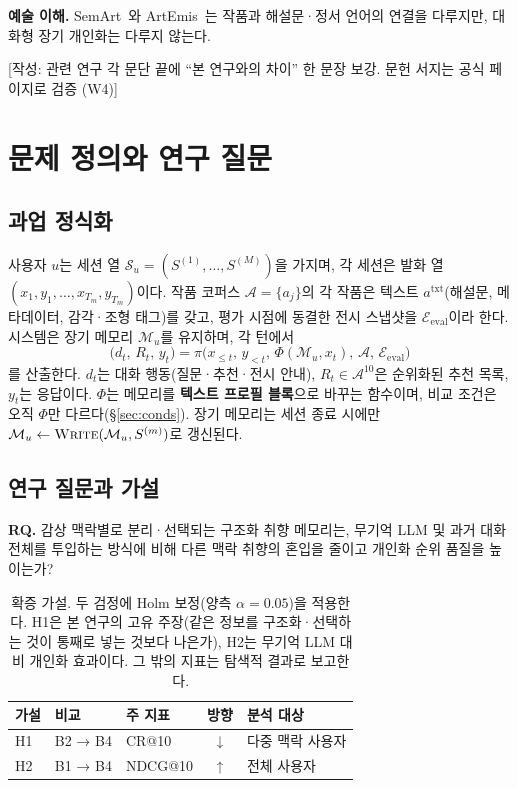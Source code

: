 \documentclass[10pt,twocolumn,letterpaper]{article}
\newcommand{\todo}[1]{{\sffamily\footnotesize\textcolor{todoc}{[작성: #1]}}}
\newcommand{\cA}{\mathcal{A}}
\newcommand{\cE}{\mathcal{E}}
\newcommand{\cM}{\mathcal{M}}
\newcommand{\cS}{\mathcal{S}}
\newcommand{\op}[1]{\textsc{#1}}
\begin{document}
\textbf{예술 이해.} SemArt~\cite{garcia2018semart}와 ArtEmis~\cite{achlioptas2021artemis}는 작품과 해설문·정서 언어의 연결을 다루지만, 대화형 장기 개인화는 다루지 않는다.

\todo{관련 연구 각 문단 끝에 ``본 연구와의 차이'' 한 문장 보강. 문헌 서지는 공식 페이지로 검증 (W4)}

\section{문제 정의와 연구 질문}
\label{sec:rq}

\subsection{과업 정식화}
사용자 $u$는 세션 열 $\cS_u=(S^{(1)},\dots,S^{(M)})$을 가지며, 각 세션은 발화 열 $(x_1,y_1,\dots,x_{T_m},y_{T_m})$이다. 작품 코퍼스 $\cA=\{a_j\}$의 각 작품은 텍스트 $a^{\mathrm{txt}}$(해설문, 메타데이터, 감각·조형 태그)를 갖고, 평가 시점에 동결한 전시 스냅샷을 $\cE_{\mathrm{eval}}$이라 한다. 시스템은 장기 메모리 $\cM_u$를 유지하며, 각 턴에서
\begin{equation}
\bigl(d_t,\,R_t,\,y_t\bigr)=\pi\bigl(x_{\le t},\,y_{<t},\,\Phi(\cM_u,x_t),\,\cA,\,\cE_{\mathrm{eval}}\bigr)
\label{eq:task}
\end{equation}
를 산출한다. $d_t$는 대화 행동(질문·추천·전시 안내), $R_t\in\cA^{10}$은 순위화된 추천 목록, $y_t$는 응답이다. $\Phi$는 메모리를 \textbf{텍스트 프로필 블록}으로 바꾸는 함수이며, 비교 조건은 오직 $\Phi$만 다르다(§\ref{sec:conds}). 장기 메모리는 세션 종료 시에만 $\cM_u\leftarrow\op{Write}(\cM_u,S^{(m)})$로 갱신된다.

\subsection{연구 질문과 가설}
\textbf{RQ.} 감상 맥락별로 분리·선택되는 구조화 취향 메모리는, 무기억 LLM 및 과거 대화 전체를 투입하는 방식에 비해 다른 맥락 취향의 혼입을 줄이고 개인화 순위 품질을 높이는가?

\begin{table}[t]
\centering\small
\setlength{\tabcolsep}{4pt}
\begin{tabularx}{\columnwidth}{@{}l l l c >{\raggedright\arraybackslash}X@{}}
\toprule
가설 & 비교 & 주 지표 & 방향 & 분석 대상 \\
\midrule
H1 & B2 → B4 & CR@10 & ↓ & 다중 맥락 사용자 \\
H2 & B1 → B4 & NDCG@10 & ↑ & 전체 사용자 \\
\bottomrule
\end{tabularx}
\caption{확증 가설. 두 검정에 Holm 보정(양측 $\alpha=0.05$)을 적용한다. H1은 본 연구의 고유 주장(같은 정보를 구조화·선택하는 것이 통째로 넣는 것보다 나은가), H2는 무기억 LLM 대비 개인화 효과이다. 그 밖의 지표는 탐색적 결과로 보고한다.}
\label{tab:hyp}
\end{table}
\end{document}
